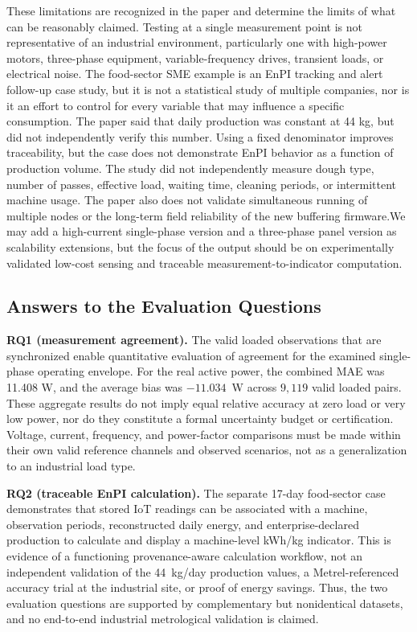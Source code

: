 \documentclass[technologies,article,submit,pdftex,moreauthors]{Definitions/mdpi}
\begin{document}
These limitations are recognized in the paper and determine the limits of what can be reasonably claimed. Testing at a single measurement point is not representative of an industrial environment, particularly one with high-power motors, three-phase equipment, variable-frequency drives, transient loads, or electrical noise. The food-sector SME example is an EnPI tracking and alert follow-up case study, but it is not a statistical study of multiple companies, nor is it an effort to control for every variable that may influence a specific consumption. The paper said that daily production was constant at 44 kg, but did not independently verify this number. Using a fixed denominator improves traceability, but the case does not demonstrate EnPI behavior as a function of production volume. The study did not independently measure dough type, number of passes, effective load, waiting time, cleaning periods, or intermittent machine usage.
The paper also does not validate simultaneous running of multiple nodes or the long-term field reliability of the new buffering firmware.We may add a high-current single-phase version and a three-phase panel version as scalability extensions, but the focus of the output should be on experimentally validated low-cost sensing and traceable measurement-to-indicator computation. 

\subsection{Answers to the Evaluation Questions}
\label{subsec:rq-answers}
\textbf{RQ1 (measurement agreement).} The valid loaded observations that are synchronized enable quantitative evaluation of agreement for the examined single-phase operating envelope. For the real active power, the combined MAE was 11.408 W, and the average bias was $-11.034$~W across $9,119$ valid loaded pairs. These aggregate results do not imply equal relative accuracy at zero load or very low power, nor do they constitute a formal uncertainty budget or certification. Voltage, current, frequency, and power-factor comparisons must be made within their own valid reference channels and observed scenarios, not as a generalization to an industrial load type. 

\textbf{RQ2 (traceable EnPI calculation).} The separate 17-day food-sector case demonstrates that stored IoT readings can be associated with a machine, observation periods, reconstructed daily energy, and enterprise-declared production to calculate and display a machine-level kWh/kg indicator. This is evidence of a functioning provenance-aware calculation workflow, not an independent validation of the 44~kg/day production values, a Metrel-referenced accuracy trial at the industrial site, or proof of energy savings. Thus, the two evaluation questions are supported by complementary but nonidentical datasets, and no end-to-end industrial metrological validation is claimed.
\end{document}
